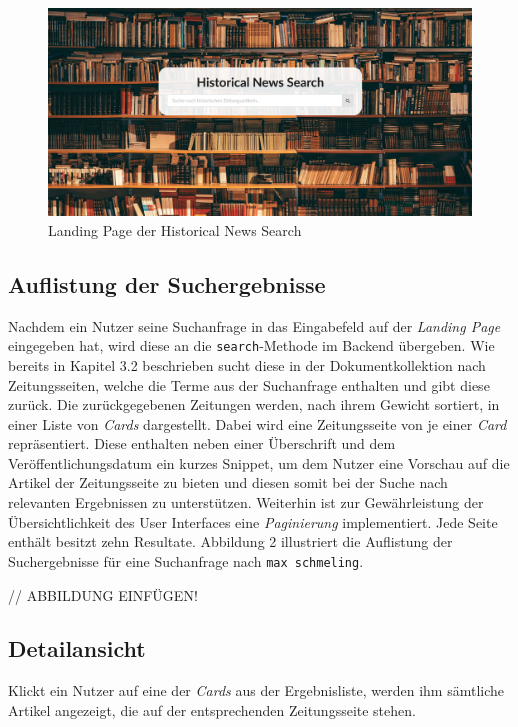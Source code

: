 \documentclass[11pt,a4paper, halfparskip]{scrartcl}
\begin{document}
\begin{figure}[h]
	\includegraphics[width=\linewidth]{images/landing_page.png}
	\caption{Landing Page der Historical News Search}
\end{figure}

\subsection{Auflistung der Suchergebnisse}

Nachdem ein Nutzer seine Suchanfrage in das Eingabefeld auf der \textit{Landing Page} eingegeben hat, wird diese an die \texttt{search}-Methode im Backend übergeben.
Wie bereits in Kapitel 3.2 beschrieben sucht diese in der Dokumentkollektion nach Zeitungsseiten, welche die Terme aus der Suchanfrage enthalten und gibt diese zurück. 
Die zurückgegebenen Zeitungen werden, nach ihrem Gewicht sortiert, in einer Liste von \textit{Cards} dargestellt.
Dabei wird eine Zeitungsseite von je einer \textit{Card} repräsentiert.
Diese enthalten neben einer Überschrift und dem Veröffentlichungsdatum ein kurzes Snippet, um dem Nutzer eine Vorschau auf die Artikel der Zeitungsseite zu bieten und diesen somit bei der Suche nach relevanten Ergebnissen zu unterstützen.
Weiterhin ist zur Gewährleistung der Übersichtlichkeit des User Interfaces eine \textit{Paginierung} implementiert.
Jede Seite enthält besitzt zehn Resultate. 
Abbildung 2 illustriert die Auflistung der Suchergebnisse für eine Suchanfrage nach \texttt{max schmeling}.

// ABBILDUNG EINFÜGEN!

\subsection{Detailansicht}

Klickt ein Nutzer auf eine der \textit{Cards} aus der Ergebnisliste, werden ihm sämtliche Artikel angezeigt, die auf der entsprechenden Zeitungsseite stehen.
\end{document}
